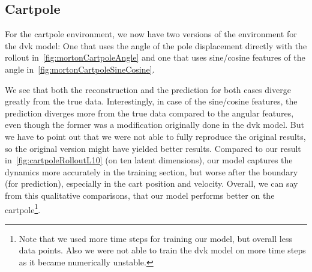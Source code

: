 	\pagebreak
	\subsection{Cartpole}
		For the cartpole environment, we now have two versions of the environment for the \ac{dvk} model: One that uses the angle of the pole displacement directly with the rollout in~\autoref{fig:mortonCartpoleAngle} and one that uses sine/cosine features of the angle in~\autoref{fig:mortonCartpoleSineCosine}.

		We see that both the reconstruction and the prediction for both cases diverge greatly from the true data. Interestingly, in case of the sine/cosine features, the prediction diverges more from the true data compared to the angular features, even though the former was a modification originally done in the \ac{dvk} model. But we have to point out that we were not able to fully reproduce the original results, so the original version might have yielded better results. Compared to our result in~\autoref{fig:cartpoleRolloutL10} (on ten latent dimensions), our model captures the dynamics more accurately in the training section, but worse after the boundary (\ie for prediction), especially in the cart position and velocity. Overall, we can say from this qualitative comparisons, that our model performs better on the cartpole\footnote{Note that we used more time steps for training our model, but overall less data points. Also we were not able to train the \ac{dvk} model on more time steps as it became numerically unstable.}.

